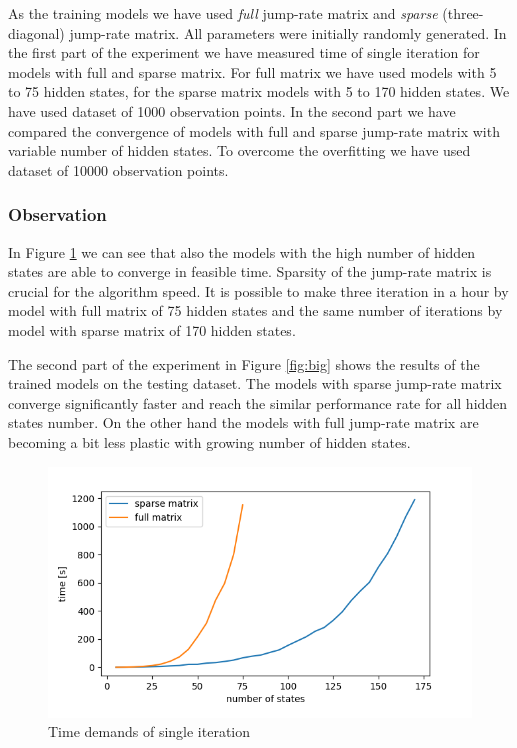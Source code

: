 \documentclass[thesis=M,english]{FITthesis}[2012/10/20]
\begin{document}
As the training models we have used \textit{full} jump-rate matrix and \textit{sparse} (three-diagonal) jump-rate matrix. All parameters were initially randomly generated. In the first part of the experiment we have measured time of single iteration for models with full and sparse matrix.
For full matrix we have used models with 5 to 75 hidden states, for the sparse matrix models with 5 to 170 hidden states. We have used dataset of 1000 observation points.
 In the second part we have compared the convergence of models with full and sparse jump-rate matrix with variable number of hidden states. To overcome the overfitting we have used dataset of 10000 observation points.    

\subsubsection*{ Observation }

In Figure \ref{fig:time} we can see that also the models with the high number of hidden states are able to converge in feasible time. Sparsity of the jump-rate matrix is crucial for the algorithm speed. It is possible to make three iteration in a hour by model with full matrix of 75 hidden states and the same number of iterations by model with sparse matrix of 170 hidden states.   

The second part of the experiment in Figure \ref{fig:big} shows the results of the trained models on the testing dataset. The models with sparse jump-rate matrix converge significantly faster and reach the similar performance rate for all hidden states number. On the other hand the models with full jump-rate matrix are becoming a bit less plastic with growing number of hidden states.

\begin{figure}
\centering
\includegraphics[width=1\linewidth]{img/ex5.2/time.png}
\caption{Time demands of single iteration }
\label{fig:time}
\end{figure}
\end{document}
